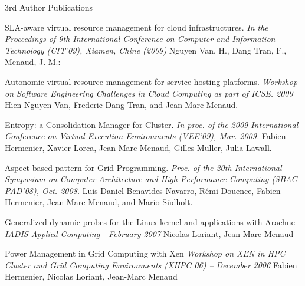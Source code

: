 \begin{frame}[allowframebreaks]{3rd Author Publications}

\begin{thebibliography}{2}

{ 
\small

\beamertemplatearticlebibitems {}SLA-aware virtual resource
 management for cloud infrastructures. 
\newblock\emph{In the Proceedings of 9th International Conference on Computer 
and Information Technology (CIT'09), Xiamen, Chine (2009)}
\newblock Nguyen Van, H., Dang Tran, F., Menaud, J.-M.: 

\beamertemplatearticlebibitems {}Autonomic virtual resource
 management for service hosting platforms. 
\newblock\emph{Workshop on Software Engineering Challenges in Cloud Computing 
as part of ICSE. 2009}
\newblock Hien Nguyen Van, Frederic Dang Tran, and Jean-Marc Menaud. 

\beamertemplatearticlebibitems {}Entropy: a Consolidation 
Manager for Cluster. 
\newblock\emph{In proc. of the 2009 International Conference on Virtual 
Execution Environments (VEE'09), Mar. 2009.}
\newblock Fabien Hermenier, Xavier Lorca, Jean-Marc Menaud, Gilles Muller, 
Julia Lawall. 

\beamertemplatearticlebibitems {}Aspect-based pattern 
for Grid Programming. 
\newblock\emph{Proc. of the 20th International Symposium on Computer 
Architecture and High Performance Computing (SBAC-PAD'08), Oct. 2008.}
\newblock Luis Daniel Benavides Navarro, Rémi Douence, Fabien Hermenier, 
Jean-Marc Menaud, and Mario Südholt. 

\beamertemplatearticlebibitems {}Generalized dynamic 
probes for the Linux kernel and applications with Arachne 
\newblock\emph{IADIS Applied Computing  - February 2007}
\newblock Nicolas Loriant, Jean-Marc Menaud 

\beamertemplatearticlebibitems {}Power Management in Grid 
Computing with Xen 
\newblock\emph{Workshop on XEN in HPC Cluster and Grid Computing Environments 
(XHPC 06) – December 2006}
\newblock Fabien Hermenier, Nicolas Loriant, Jean-Marc Menaud 

}
\end{thebibliography}

\end{frame}


